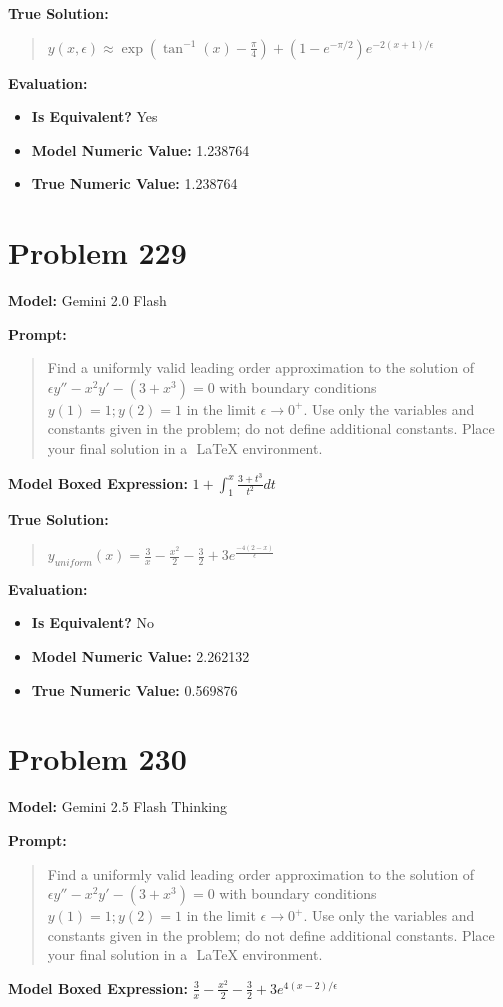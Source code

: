 \documentclass{article}
\begin{document}
{\textbf{True Solution:}
\begin{quote}
$y(x,\epsilon) \approx \exp\left(\tan^{-1}(x) - \frac{\pi}{4}\right) + \left(1 - e^{-\pi/2}\right) e^{- 2(x+1)/ \epsilon}$
\end{quote}

\textbf{Evaluation:}
\begin{itemize}
\item \textbf{Is Equivalent?} Yes
\item \textbf{Model Numeric Value:} 1.238764
\item \textbf{True Numeric Value:} 1.238764
\end{itemize}
\vspace{1cm}
\section*{Problem 229}
\textbf{Model:} Gemini 2.0 Flash

\textbf{Prompt:}
\begin{quote}
Find a uniformly valid leading order approximation to the solution of $\epsilon y'' - x^2y' - (3+x^3) = 0$ with boundary conditions $y(1) = 1; y(2) = 1$ in the limit $\epsilon \to 0^+$. Use only the variables and constants given in the problem; do not define additional constants. Place your final solution in a $\boxed{}$ LaTeX environment.
\end{quote}
\textbf{Model Boxed Expression:} $1 + \int_1^x \frac{3+t^3}{t^2} dt$

\textbf{True Solution:}
\begin{quote}
$y_{uniform}(x) = \frac{3}{x} -\frac{x^2}{2} -\frac{3}{2} + 3e^{\frac{-4(2-x)}{\epsilon}}$
\end{quote}

\textbf{Evaluation:}
\begin{itemize}
\item \textbf{Is Equivalent?} No
\item \textbf{Model Numeric Value:} 2.262132
\item \textbf{True Numeric Value:} 0.569876
\end{itemize}
\vspace{1cm}
\section*{Problem 230}
\textbf{Model:} Gemini 2.5 Flash Thinking

\textbf{Prompt:}
\begin{quote}
Find a uniformly valid leading order approximation to the solution of $\epsilon y'' - x^2y' - (3+x^3) = 0$ with boundary conditions $y(1) = 1; y(2) = 1$ in the limit $\epsilon \to 0^+$. Use only the variables and constants given in the problem; do not define additional constants. Place your final solution in a $\boxed{}$ LaTeX environment.
\end{quote}
\textbf{Model Boxed Expression:} $\frac{3}{x} - \frac{x^2}{2} - \frac{3}{2} + 3e^{4(x-2)/\epsilon}$

}
\end{document}
